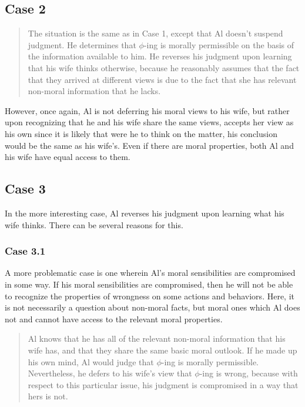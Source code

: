 \documentclass[
  12pt,
]{book}
\theoremstyle{definition}
\theoremstyle{definition}
\theoremstyle{definition}
\theoremstyle{definition}
\theoremstyle{remark}
\begin{document}
\subsection*{Case 2}\label{case-2}

\begin{quote}
The situation is the same as in Case 1, except that Al doesn't suspend judgment. He determines that \(\phi\)-ing is morally permissible on the basis of the information available to him. He reverses his judgment upon learning that his wife thinks otherwise, because he reasonably assumes that the fact that they arrived at different views is due to the fact that she has relevant non-moral information that he lacks.
\end{quote}

However, once again, Al is not deferring his moral views to his wife, but rather upon recognizing that he and his wife share the same views, accepts her view as his own since it is likely that were he to think on the matter, his conclusion would be the same as his wife's. Even if there are moral properties, both Al and his wife have equal access to them.

\subsection*{Case 3}\label{case-3}

In the more interesting case, Al reverses his judgment upon learning what his wife thinks. There can be several reasons for this.

\subsubsection*{Case 3.1}\label{case-3.1}

A more problematic case is one wherein Al's moral sensibilities are compromised in some way. If his moral sensibilities are compromised, then he will not be able to recognize the properties of wrongness on some actions and behaviors. Here, it is not necessarily a question about non-moral facts, but moral ones which Al does not and cannot have access to the relevant moral properties.

\begin{quote}
Al knows that he has all of the relevant non-moral information that his wife has, and that they share the same basic moral outlook. If he made up his own mind, Al would judge that \(\phi\)-ing is morally permissible. Nevertheless, he defers to his wife's view that \(\phi\)-ing is wrong, because with respect to this particular issue, his judgment is compromised in a way that hers is not.
\end{quote}
\end{document}
